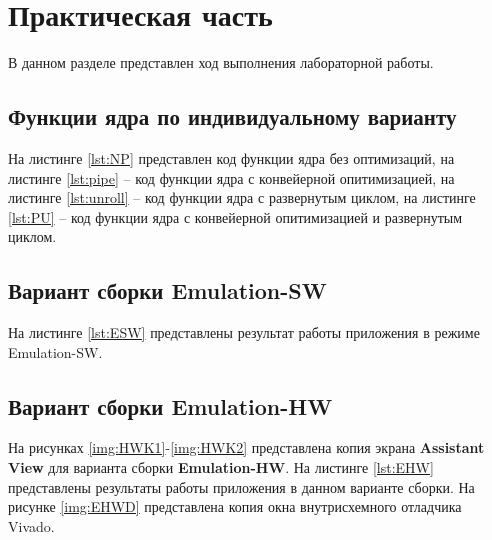 \chapter{Практическая часть}

В данном разделе представлен ход выполнения лабораторной работы.

\section{Функции ядра по индивидуальному варианту}

На листинге \ref{lst:NP} представлен код функции ядра без оптимизаций, на
листинге \ref{lst:pipe} -- код функции ядра с конвейерной опитимизацией, на
листинге \ref{lst:unroll} -- код функции ядра с развернутым циклом, на листинге
\ref{lst:PU} -- код функции ядра с конвейерной опитимизацией и развернутым
циклом.





\section{Вариант сборки Emulation-SW}

На листинге \ref{lst:ESW} представлены результат работы приложения в режиме Emulation-SW.


\section{Вариант сборки Emulation-HW}

На рисунках \ref{img:HWK1}-\ref{img:HWK2} представлена копия экрана
\textbf{Assistant View} для варианта сборки \textbf{Emulation-HW}. На листинге
\ref{lst:EHW} представлены результаты работы приложения в данном варианте
сборки. На рисунке \ref{img:EHWD} представлена копия окна внутрисхемного
отладчика Vivado.


